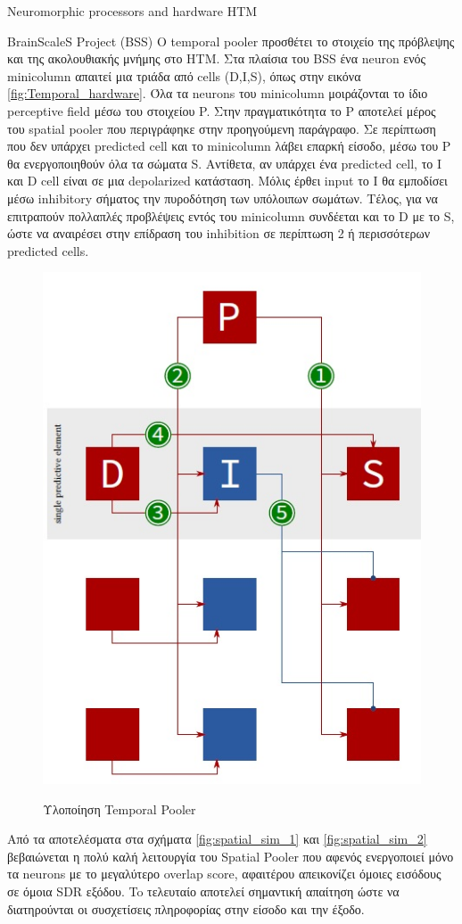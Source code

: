 \documentclass[a4paper,11pt]{article}
\begin{document}
\begin{section}{Neuromorphic processors and hardware HTM}
\begin{subsection}{BrainScaleS Project (BSS)}
    O temporal pooler προσθέτει το στοιχείο της πρόβλεψης και της ακολουθιακής μνήμης στο HTM. Στα πλαίσια του BSS ένα neuron ενός minicolumn απαιτεί μια τριάδα από cells (D,I,S), όπως στην εικόνα \eqref{fig:Temporal_hardware}. Όλα τα neurons του minicolumn μοιράζονται το ίδιο perceptive field μέσω του στοιχείου P. Στην πραγματικότητα το P αποτελεί μέρος του spatial pooler που περιγράφηκε στην προηγούμενη παράγραφο. Σε περίπτωση που δεν υπάρχει predicted cell και το minicolumn λάβει επαρκή είσοδο, μέσω του P θα ενεργοποιηθούν όλα τα σώματα S. Αντίθετα, αν υπάρχει ένα predicted cell, το I και D cell είναι σε μια depolarized κατάσταση. Μόλις έρθει input το I θα εμποδίσει μέσω inhibitory σήματος την πυροδότηση των υπόλοιπων σωμάτων. Τέλος, για να επιτραπούν πολλαπλές προβλέψεις εντός του minicolumn συνδέεται και το D με το S, ώστε να αναιρέσει στην επίδραση του inhibition σε περίπτωση 2 ή περισσότερων predicted cells.\\
\begin{figure}[H]
  \centering%
  {\includegraphics[width=0.4\columnwidth,clip=true]{pics/temporal_hardware.jpg}}
  \caption{Υλοποίηση Temporal Pooler} \label{fig:Temporal_hardware}
\end{figure}
Από τα αποτελέσματα στα σχήματα \eqref{fig:spatial_sim_1} και \eqref{fig:spatial_sim_2} βεβαιώνεται η πολύ καλή λειτουργία του Spatial Pooler που αφενός ενεργοποιεί μόνο τα neurons με το μεγαλύτερο overlap score, αφαιτέρου απεικονίζει όμοιες εισόδους σε όμοια SDR εξόδου. To τελευταίο αποτελεί σημαντική απαίτηση ώστε να διατηρούνται οι συσχετίσεις πληροφορίας στην είσοδο και την έξοδο.
\begin{figure} [H]
  \centering%
  \begin{subfigure}{0.5\columnwidth}

\end{subfigure}
\end{figure}
\end{subsection}
\end{section}
\end{document}
